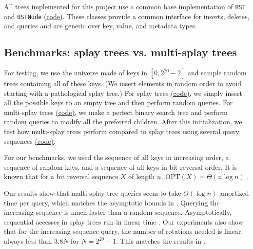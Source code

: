 \documentclass{article}
\newcommand{\OPT}{\text{OPT}}
\begin{document}

All trees implemented for this project use a common base implementation of \texttt{BST} and \texttt{BSTNode} \href{https://github.com/6851-2021/tango-trees/blob/master/src/bst.hpp}{(code)}. These classes provide a common interface for inserts, deletes, and queries and are generic over key, value, and metadata types.



\subsection{Benchmarks: splay trees vs. multi-splay trees} \label{section:benchmarks}
For testing, we use the universe made of keys in $[0, 2^{20} - 2]$ and sample random trees containing all of these keys. (We insert elements in random order to avoid starting with a pathological splay tree.)  For splay trees \href{https://github.com/6851-2021/tango-trees/blob/master/src/splay.hpp}{(code)}, we simply insert all the possible keys to an empty tree and then perform random queries. For multi-splay trees \href{https://github.com/6851-2021/tango-trees/blob/master/src/multisplay.hpp}{(code)}, we make a perfect binary search tree and perform random queries to modify all the preferred children. After this initialization, we test how multi-splay trees perform compared to splay trees using several query sequences \href{https://github.com/6851-2021/tango-trees/blob/master/main.cc}{(code)}. 

For our benchmarks, we used the sequence of all keys in increasing order, a sequence of random keys, and a sequence of all keys in bit reversal order. It is known that for a bit reversal sequence $X$ of length $n$, $\OPT(X) = \Theta(n \log n)$ \cite{wilber1989lower}.

Our results show that multi-splay tree queries seem to take $O(\log n)$ amortized time per query, which matches the asymptotic bounds in \cite{sleator2004dynamic}. Querying the increasing sequence is much faster than a random sequence. Asymptotically, sequential accesses in splay trees run in linear time \cite{tarjan1985sequential}. Our experiments also show that for the increasing sequence query, the number of rotations needed is linear, always less than $3.8N$ for $N = 2^{20}-1$. This matches the results in \cite{sleator2004dynamic}.
\end{document}
